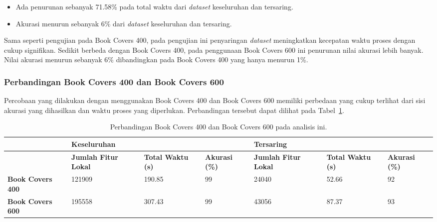 \begin{itemize}
	\item Ada penurunan sebanyak 71.58\% pada total waktu dari \textit{dataset} keseluruhan dan tersaring.
	\item Akurasi menurun sebanyak 6\% dari \textit{dataset} keseluruhan dan tersaring.
\end{itemize}
Sama seperti pengujian pada Book Covers 400, pada pengujian ini penyaringan \textit{dataset} meningkatkan kecepatan waktu proses dengan cukup signifikan. Sedikit berbeda dengan Book Covers 400, pada penggunaan Book Covers 600 ini penurunan nilai akurasi lebih banyak. Nilai akurasi menurun sebanyak 6\% dibandingkan pada Book Covers 400 yang hanya menurun 1\%. 

\subsubsection{Perbandingan Book Covers 400 dan Book Covers 600}
Percobaan yang dilakukan dengan menggunakan Book Covers 400 dan Book Covers 600 memiliki perbedaan yang cukup terlihat dari sisi akurasi yang dihasilkan dan waktu proses yang diperlukan. Perbandingan tersebut dapat dilihat pada Tabel~\ref{tab:perbandingan_analisis_bsis}.
\begin{table}[H]
	\centering
	\begin{tabular}{|p{}|p{}p{}p{}|p{}p{}p{}|}
		\hline
		& \multicolumn{3}{p{0.1\textwidth}|}{\textbf{Keseluruhan}}                                                                                                     & \multicolumn{3}{p{0.1\textwidth}|}{\textbf{Tersaring}}                                                                                                       \\ \hline
		& \multicolumn{1}{p{0.1\textwidth}|}{\textbf{Jumlah Fitur Lokal}} & \multicolumn{1}{p{0.1\textwidth}|}{\textbf{Total Waktu (s)}} & \multicolumn{1}{p{0.1\textwidth}|}{\textbf{Akurasi (\%)}} & \multicolumn{1}{p{0.1\textwidth}|}{\textbf{Jumlah Fitur Lokal}} & \multicolumn{1}{p{0.1\textwidth}|}{\textbf{Total Waktu (s)}} & \multicolumn{1}{p{0.1\textwidth}|}{\textbf{Akurasi (\%)}} \\ \hline
		\textbf{Book Covers 400} & \multicolumn{1}{l|}{121909}                      & \multicolumn{1}{l|}{190.85}                   & 99                                         & \multicolumn{1}{l|}{24040}                       & \multicolumn{1}{l|}{52.66}                    & 92                                         \\ \hline
		\textbf{Book Covers 600} & \multicolumn{1}{l|}{195558}                      & \multicolumn{1}{l|}{307.43}                   & 99                                         & \multicolumn{1}{l|}{43056}                       & \multicolumn{1}{l|}{87.37}                    & 93                                         \\ \hline
	\end{tabular}
	\caption{Perbandingan Book Covers 400 dan Book Covers 600 pada analisis ini.}
	\label{tab:perbandingan_analisis_bsis}
\end{table}

